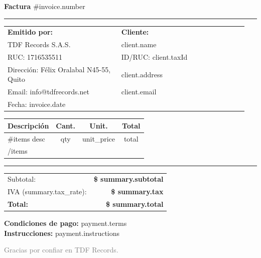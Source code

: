 \documentclass[11pt,a4paper]{article}
\begin{document}
\vspace*{10mm}

{\Huge\bfseries Factura} \hfill {\Large \#{{invoice.number}}}

\vspace{2mm}
\noindent\rule{\textwidth}{0.4pt}
\vspace{3mm}

\begin{tabular}{p{0.45\linewidth} p{0.5\linewidth}}
\textbf{Emitido por:} & \textbf{Cliente:}\\
TDF Records S.A.S. & {{client.name}}\\
RUC: 1716535511 & ID/RUC: {{client.taxId}}\\
Dirección: Félix Oralabal N45-55, Quito & {{client.address}}\\
Email: info@tdfrecords.net & {{client.email}}\\
Fecha: {{invoice.date}} &  \ \ 
\end{tabular}

\vspace{6mm}

\begin{tabular}{p{8.5cm} S[table-format=2.2] S[table-format=2.2] S[table-format=2.2]}
\toprule
\textbf{Descripción} & \textbf{Cant.} & \textbf{Unit.} & \textbf{Total}\\
\midrule
{{#items}}
{{desc}} & {{qty}} & {{unit_price}} & {{total}}\\
{{/items}}
\bottomrule
\end{tabular}

\vspace{3mm}
\noindent\rule{\textwidth}{0.4pt}

\begin{flushright}
\begin{tabular}{lr}
Subtotal: & \textbf{\$ {{summary.subtotal}}}\\
IVA ({{summary.tax_rate}}): & \textbf{\$ {{summary.tax}}}\\
\textbf{Total:} & \textbf{\$ {{summary.total}}}\\
\end{tabular}
\end{flushright}

\vspace{10mm}
\textbf{Condiciones de pago:} {{payment.terms}}\\
\textbf{Instrucciones:} {{payment.instructions}}

\vfill
\textcolor{gray}{Gracias por confiar en TDF Records.}
\end{document}
